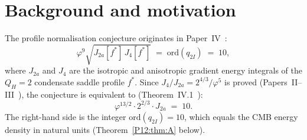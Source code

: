 \documentclass[11pt,a4paper]{article}
\theoremstyle{definition}
\theoremstyle{remark}
\newcommand{\vp}{\varphi}
\newcommand{\bst}{\beta^{*}}
\newcommand{\Efb}{E_{\mathrm{fb}}}
\newcommand{\Ja}{J_{2a}}
\newcommand{\Jfour}{J_{4}}
\newcommand{\ms}{\mu^{*}}
\newcommand{\TCMB}{T_{\mathrm{CMB}}}
\newcommand{\Lcond}{\Lambda_{\mathrm{cond}}}
\newcommand{\rCMB}{\rho_{\mathrm{CMB}}}
\newcommand{\ord}{\mathrm{ord}}
\begin{document}
\begin{abstract}
\smallskip
\noindent\textbf{Closed form for $x^*=R_0/C^*$ (Corollary~\ref{P12:cor:xstar}).}
Combining Theorem~\ref{P12:thm:E} with the CMB normalisation
$\bst=300/\pi^2$ yields the exact closed form
\[
  x^* = \frac{\pi\,\tan^3(q^*)}{9600\sqrt{6}\,\vp^{23}},
\]
and at leading order (zeroth Newton approximation $q^*\approx\pi/5$,
using $\tan(\pi/5)=\sqrt{\ms}/\vp$ from Theorem~\ref{P12:thm:B}):
\[
  x^*_0 = \frac{\pi\,(3-\vp)^{3/2}}{9600\sqrt{6}\,\vp^{26}}
  \approx 7.996\times10^{-10},
\]
with $2.60\%$ error corrected to $0.010\%$ by the first Newton step $d_1$.
The physical condensate torus is in the ultra-inverted regime
$C^*/R_0\approx1.22\times10^9$, not the thin-torus limit.

\smallskip
\noindent\textbf{The one-parameter chain.}
Combined with Paper~I, the result closes the derivation:
\[
  \TCMB
  \;\xrightarrow{\Lcond}\;
  \rCMB=10
  \;\xrightarrow{\Efb/V=\rCMB}\;
  \vp^9\sqrt{\Ja\Jfour}=10
  \;\xrightarrow{\text{Paper~I}}\;
  m_e = \Lcond\,\vp^{20}\,e^{4\pi-3/400}.
\]
The electron mass is derivable from $\TCMB$ alone with no free parameters.
\end{abstract}

\tableofcontents\newpage

\section{Background and motivation}
\label{P12:sec:background}

The profile normalisation conjecture originates in Paper~IV~\cite{Paper4}:
\begin{equation}
  \boxed{
  \vp^9\sqrt{\Ja[f^*]\,\Jfour[f^*]} \;=\; \ord(q_{2I}) \;=\; 10,
  }
  \label{P12:eq:conjecture}
\end{equation}
where $\Ja$ and $\Jfour$ are the isotropic and anisotropic
gradient energy integrals of the $Q_H=2$ condensate saddle profile $f^*$.
Since $\Jfour/\Ja = 2^{4/3}/\vp^5$ is proved (Papers~II--III~\cite{Paper2,Paper3}),
the conjecture is equivalent to (Theorem~IV.1~\cite{Paper4}):
\begin{equation}
  \boxed{
  \vp^{13/2}\cdot2^{2/3}\cdot\Ja \;=\; 10.
  }
  \label{P12:eq:reduced}
\end{equation}
The right-hand side is the integer $\ord(q_{2I})=10$, which equals
the CMB energy density in natural units (Theorem~\ref{P12:thm:A} below).
\end{document}
